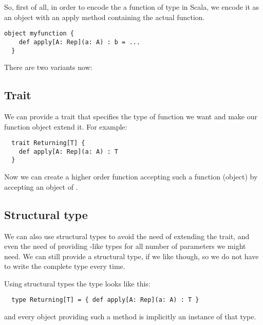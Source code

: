 So, first of all, in order to encode the a function of type 
in Scala, we encode it as an object with an apply method containing the actual
function.
\begin{lstlisting}[float=ht,caption=Encoding a universal function]
  object myfunction {
    def apply[A: Rep](a: A) : b = ...
  }
\end{lstlisting}
There are two variants now:

\subsection{Trait}
We can provide a  trait that specifies the type of function we want and make our
function object extend it. For example:
\begin{lstlisting}
  trait Returning[T] {
    def apply[A: Rep](a: A) : T
  }
\end{lstlisting}
Now we can create a higher order function accepting such a function (object)
by accepting an object of .

\subsection{Structural type}
We can also use structural types to avoid the need of extending the trait, and
even the need of providing -like types for all number of parameters
we might need. We can still provide a  structural type, if we like
though, so we do not have to write the complete type every time.

Using structural types the  type looks like this:
\begin{lstlisting}
  type Returning[T] = { def apply[A: Rep](a: A) : T }
\end{lstlisting}
and every object providing such a method is implicitly an instance of that type.
